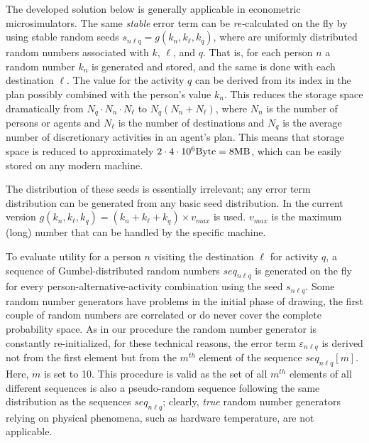The developed solution below is generally applicable in econometric microsimulators. The same \emph{stable} error term can be \emph{re-}calculated on the fly by using stable random seeds $s_{n\ell q} = g(k_n, k_\ell, k_q)$, where are uniformly distributed random numbers associated with $k$, $\ell$, and $q$. 
That is, for each person $n$ a random number $k_n$ is generated and stored, and the same is done with each destination $\ell$. 
The value for the activity $q$ can be derived from its index in the plan possibly combined with the person's value $k_n$. 
This reduces the storage space dramatically from $N_q \cdot N_n \cdot N_{\ell}$ to $N_q (N_n + N_{\ell})$, where $N_n$ is the number of persons or agents and $N_{\ell}$ is the number of destinations and $N_q$ is the average number of discretionary activities in an agent's plan.  
This means that storage space is reduced to approximately $2 \cdot 4 \cdot 10^{6} \hbox{Byte} = 8 \hbox{MB}$, which can be easily stored 
on any modern machine.

The distribution of these seeds is essentially irrelevant; any error term distribution can be generated from any basic seed distribution. 
In the current version $g(k_n, k_\ell, k_q) = (k_n + k_\ell + k_q) \times v_{max}$ is used. $v_{max}$ is the maximum (long) number that can be handled by the specific machine.

To evaluate utility for a person $n$ visiting the destination $\ell$ for activity $q$, a sequence of Gumbel-distributed random numbers $seq_{n\ell q}$ is generated on the fly for every person-alternative-activity combination using the seed $s_{n\ell q}$. 
Some random number generators have problems in the initial phase of drawing, \eg the first couple of random numbers are correlated or do never cover the complete probability space. As in our procedure the random number generator is constantly re-initialized, for these technical reasons, the error term $\varepsilon_{n\ell q}$ is derived not from the first element but from the $m^{th}$ element of the sequence $seq_{n\ell q}[m]$. 
Here, $m$ is set to 10. 
This procedure is valid as the set of all  $m^{th}$ elements of all different sequences is also a pseudo-random sequence following the same distribution as the sequences $seq_{n\ell q}$; clearly, \emph{true} random number generators relying on physical phenomena, such as hardware temperature, are not applicable. 

